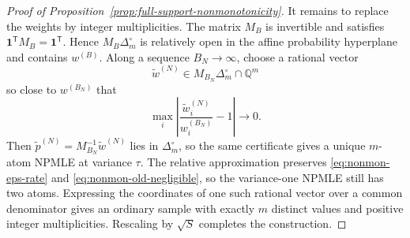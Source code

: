 \begin{proof}[Proof of Proposition~\ref{prop:full-support-nonmonotonicity}]
It remains to replace the weights by integer multiplicities. The matrix
\(M_B\) is invertible and satisfies
\(\boldsymbol1^{\mathsf T}M_B=\boldsymbol1^{\mathsf T}\). Hence
\(M_B\Delta_m^\circ\) is relatively open in the affine probability
hyperplane and contains \(w^{(B)}\). Along a sequence \(B_N\to\infty\),
choose a rational vector
\[
    \widetilde w^{(N)}
    \in M_{B_N}\Delta_m^\circ\cap\mathbb Q^m
\]
so close to \(w^{(B_N)}\) that
\[
    \max_i
    \left|
       \frac{\widetilde w_i^{(N)}}{w_i^{(B_N)}}-1
    \right|\longrightarrow0.
\]
Then
\(\widetilde p^{(N)}=M_{B_N}^{-1}\widetilde w^{(N)}\) lies in
\(\Delta_m^\circ\), so the same certificate gives a unique \(m\)-atom NPMLE
at variance \(\tau\). The relative approximation preserves
\eqref{eq:nonmon-eps-rate} and \eqref{eq:nonmon-old-negligible}, so the
variance-one NPMLE still has two atoms. Expressing the coordinates of one
such rational vector over a common denominator gives an ordinary sample with
exactly \(m\) distinct values and positive integer multiplicities. Rescaling
by \(\sqrt S\) completes the construction.
\end{proof}
